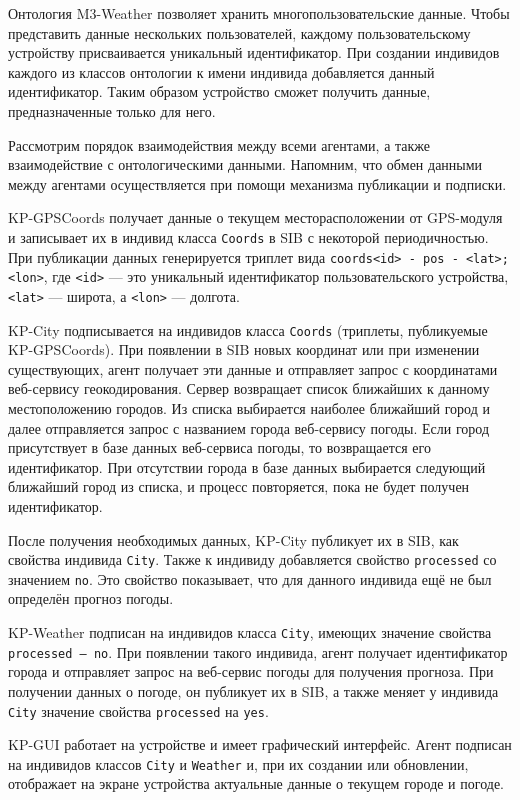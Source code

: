 Онтология M3-Weather позволяет хранить многопользовательские данные. Чтобы представить данные нескольких пользователей, каждому пользовательскому устройству присваивается уникальный идентификатор. При создании индивидов каждого из классов онтологии к имени индивида добавляется данный идентификатор. Таким образом устройство сможет получить данные, предназначенные только для него.

Рассмотрим порядок взаимодействия между всеми агентами, а также взаимодействие с онтологическими данными. Напомним, что обмен данными между агентами осуществляется при помощи механизма публикации и подписки.

KP-GPSCoords получает данные о текущем месторасположении от GPS-модуля и записывает их в индивид класса {\tt Coords} в SIB с некоторой периодичностью. 
При публикации данных генерируется триплет вида {\tt coords<id>~-~pos~-~<lat>;<lon>},
где {\tt <id>} --- это уникальный идентификатор пользовательского устройства,
{\tt <lat>} --- широта, а {\tt <lon>} --- долгота.

KP-City подписывается на индивидов класса {\tt Coords} (триплеты, публикуемые KP-GPSCoords). 
При появлении в SIB новых координат или при изменении существующих,
агент получает эти данные и отправляет запрос с координатами веб-сервису геокодирования.
Сервер возвращает список ближайших к данному местоположению городов. Из списка выбирается наиболее ближайший город и далее отправляется запрос с названием города веб-сервису погоды.
Если город присутствует в базе данных веб-сервиса погоды, то возвращается его идентификатор.
При отсутствии города в базе данных выбирается следующий ближайший город из списка, и процесс
повторяется, пока не будет получен идентификатор.

После получения необходимых данных, KP-City публикует их в SIB, как свойства индивида {\tt City}. Также к индивиду добавляется свойство {\tt processed} со значением {\tt no}. Это
свойство показывает, что для данного индивида ещё не был определён прогноз погоды. 

KP-Weather подписан на индивидов класса {\tt City}, имеющих значение свойства
{\tt processed -- no}. При появлении такого индивида, агент получает идентификатор города
и отправляет запрос на веб-сервис погоды для получения прогноза. При получении данных о погоде, он публикует их в SIB, а также меняет у индивида {\tt City} значение свойства {\tt processed} на {\tt yes}.

KP-GUI работает на устройстве и имеет графический интерфейс. Агент подписан на индивидов
классов {\tt City} и {\tt Weather} и, при их создании или обновлении, отображает на экране устройства актуальные данные о текущем городе и погоде.

